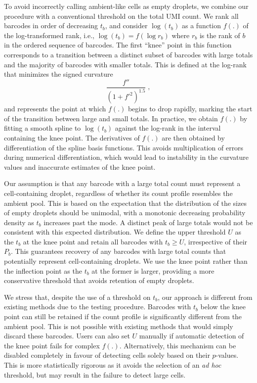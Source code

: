\documentclass{bmcart}
\begin{document}
To avoid incorrectly calling ambient-like cells as empty droplets, we combine our procedure with a conventional threshold on the total UMI count.
We rank all barcodes in order of decreasing $t_b$, and consider $\log(t_b)$ as a function $f(.)$ of the log-transformed rank,
i.e., $\log(t_b) = f(\log r_b)$ where $r_b$ is the rank of $b$ in the ordered sequence of barcodes.
The first ``knee'' point in this function corresponds to a transition between a distinct subset of barcodes with large totals and the majority of barcodes with smaller totals.
This is defined at the log-rank that minimizes the signed curvature
\[
    \frac{f''}{(1 + f'^2)^{1.5}} \;,
\]
and represents the point at which $f(.)$ begins to drop rapidly, marking the start of the transition between large and small totals.
In practice, we obtain $f(.)$ by fitting a smooth spline to $\log(t_b)$ against the log-rank in the interval containing the knee point.
The derivatives of $f(.)$ are then obtained by differentiation of the spline basis functions.
This avoids multiplication of errors during numerical differentiation, which would lead to instability in the curvature values and inaccurate estimates of the knee point.

Our assumption is that any barcode with a large total count must represent a cell-containing droplet, regardless of whether its count profile resembles the ambient pool.
This is based on the expectation that the distribution of the sizes of empty droplets should be unimodal, with a monotonic decreasing probability density as $t_b$ increases past the mode.
A distinct peak of large totals would not be consistent with this expected distribution.
We define the upper threshold $U$ as the $t_b$ at the knee point and retain all barcodes with $t_b \ge U$, irrespective of their $P_b$.
This guarantees recovery of any barcodes with large total counts that potentially represent cell-containing droplets. 
We use the knee point rather than the inflection point as the $t_b$ at the former is larger, providing a more conservative threshold that avoids retention of empty droplets.

We stress that, despite the use of a threshold on $t_b$, our approach is different from existing methods due to the testing procedure.
Barcodes with $t_b$ below the knee point can still be retained if the count profile is significantly different from the ambient pool.
This is not possible with existing methods that would simply discard these barcodes.
Users can also set $U$ manually if automatic detection of the knee point fails for complex $f(.)$.
Alternatively, this mechanism can be disabled completely in favour of detecting cells solely based on their $p$-values.
This is more statistically rigorous as it avoids the selection of an \textit{ad hoc} threshold, but may result in the failure to detect large cells.
\end{document}
